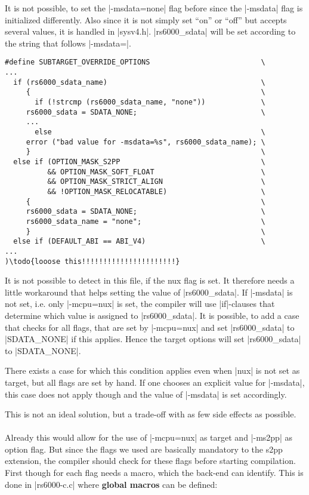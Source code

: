 It is not possible, to set the |-msdata=none| flag before since the |-msdata| flag is initialized differently.
Also since it is not simply set ``on'' or ``off'' but accepts several values, it is handled in |sysv4.h|.
|rs6000_sdata| will be set according to the string that follows |-msdata=|.
\begin{lstlisting}
#define SUBTARGET_OVERRIDE_OPTIONS                          \
...
  if (rs6000_sdata_name)                                    \
     {                                                      \
       if (!strcmp (rs6000_sdata_name, "none"))             \
     rs6000_sdata = SDATA_NONE;                             \
     ...
       else                                                 \
     error ("bad value for -msdata=%s", rs6000_sdata_name); \
     }                                                      \
  else if (OPTION_MASK_S2PP                                 \
          && OPTION_MASK_SOFT_FLOAT                         \
          && OPTION_MASK_STRICT_ALIGN                       \
          && !OPTION_MASK_RELOCATABLE)                      \
     {                                                      \
     rs6000_sdata = SDATA_NONE;                             \
     rs6000_sdata_name = "none";                            \
     }                                                      \
  else if (DEFAULT_ABI == ABI_V4)                           \
...
)\todo{looose this!!!!!!!!!!!!!!!!!!!!!!}
\end{lstlisting}

It is not possible to detect in this file, if the nux flag is set.
It therefore needs a little workaround that helps setting the value of |rs6000_sdata|.
If |-msdata| is not set, i.e. only |-mcpu=nux| is set, the compiler will use |if|-clauses that determine which value is assigned to |rs6000_sdata|.
It is possible, to add a case that checks for all flags, that are set by |-mcpu=nux| and set |rs6000_sdata| to |SDATA_NONE| if this applies.
Hence the target options will set |rs6000_sdata| to |SDATA_NONE|.

There exists a case for which this condition applies even when |nux| is not set as target, but all flags are set by hand.
If one chooses an explicit value for |-msdata|, this case does not apply though and the value of |-msdata| is set accordingly.

This is not an ideal solution, but a trade-off with as few side effects as possible.
\\
\\
Already this would allow for the use of |-mcpu=nux| as target and |-ms2pp| as option flag.
But since the flags we used are basically mandatory to the \ac{s2pp} extension, the compiler should check for these flags before starting compilation.
First though for each flag needs a macro, which the back-end can identify.
This is done in |rs6000-c.c| where \textbf{global macros} can be defined:

